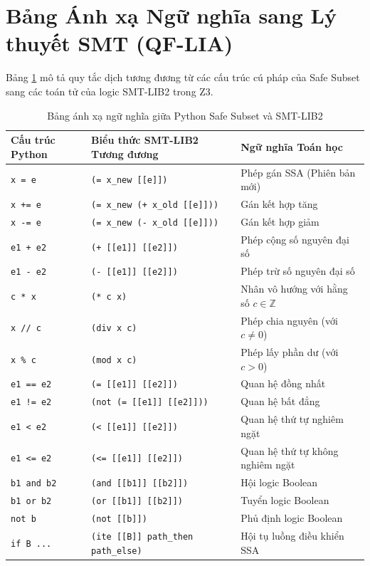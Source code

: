 \section{Bảng Ánh xạ Ngữ nghĩa sang Lý thuyết SMT (QF-LIA)}
Bảng \ref{tab:semantic_mapping_smt} mô tả quy tắc dịch tương đương từ các cấu trúc cú pháp của Safe Subset sang các toán tử của logic SMT-LIB2 trong Z3.

\begin{table}[H]
\centering
\small
\renewcommand{\arraystretch}{1.2}
\begin{tabular}{|l|l|l|}
\hline
\textbf{Cấu trúc Python} & \textbf{Biểu thức SMT-LIB2 Tương đương} & \textbf{Ngữ nghĩa Toán học} \\
\hline
\texttt{x = e} & \texttt{(= x\_new [[e]])} & Phép gán SSA (Phiên bản mới) \\
\texttt{x += e} & \texttt{(= x\_new (+ x\_old [[e]]))} & Gán kết hợp tăng \\
\texttt{x -= e} & \texttt{(= x\_new (- x\_old [[e]]))} & Gán kết hợp giảm \\
\texttt{e1 + e2} & \texttt{(+ [[e1]] [[e2]])} & Phép cộng số nguyên đại số \\
\texttt{e1 - e2} & \texttt{(- [[e1]] [[e2]])} & Phép trừ số nguyên đại số \\
\texttt{c * x} & \texttt{(* c x)} & Nhân vô hướng với hằng số $c \in \mathbb{Z}$ \\
\texttt{x // c} & \texttt{(div x c)} & Phép chia nguyên (với $c \ne 0$) \\
\texttt{x \% c} & \texttt{(mod x c)} & Phép lấy phần dư (với $c > 0$) \\
\texttt{e1 == e2} & \texttt{(= [[e1]] [[e2]])} & Quan hệ đồng nhất \\
\texttt{e1 != e2} & \texttt{(not (= [[e1]] [[e2]]))} & Quan hệ bất đẳng \\
\texttt{e1 < e2} & \texttt{(< [[e1]] [[e2]])} & Quan hệ thứ tự nghiêm ngặt \\
\texttt{e1 <= e2} & \texttt{(<= [[e1]] [[e2]])} & Quan hệ thứ tự không nghiêm ngặt \\
\texttt{b1 and b2} & \texttt{(and [[b1]] [[b2]])} & Hội logic Boolean \\
\texttt{b1 or b2} & \texttt{(or [[b1]] [[b2]])} & Tuyển logic Boolean \\
\texttt{not b} & \texttt{(not [[b]])} & Phủ định logic Boolean \\
\texttt{if B ...} & \texttt{(ite [[B]] path\_then path\_else)} & Hội tụ luồng điều khiển SSA \\
\hline
\end{tabular}
\caption{Bảng ánh xạ ngữ nghĩa giữa Python Safe Subset và SMT-LIB2}
\label{tab:semantic_mapping_smt}
\end{table}

